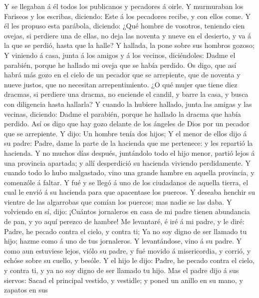  Y se llegaban á él todos los publicanos y pecadores á
oirle.  Y murmuraban los Fariseos y los escribas, diciendo:
Este á los pecadores recibe, y con ellos come.  Y él les
propuso esta parábola, diciendo:  ¿Qué hombre de vosotros,
teniendo cien ovejas, si perdiere una de ellas, no deja las noventa y
nueve en el desierto, y va á la que se perdió, hasta que la halle?
 Y hallada, la pone sobre sus hombros gozoso;  Y
viniendo á casa, junta á los amigos y á los vecinos, diciéndoles: Dadme
el parabién, porque he hallado mi oveja que se había perdido.
 Os digo, que así habrá más gozo en el cielo de un pecador
que se arrepiente, que de noventa y nueve justos, que no necesitan
arrepentimiento.  ¿O qué mujer que tiene diez dracmas, si
perdiere una dracma, no enciende el candil, y barre la casa, y busca con
diligencia hasta hallarla?  Y cuando la hubiere hallado,
junta las amigas y las vecinas, diciendo: Dadme el parabién, porque he
hallado la dracma que había perdido.  Así os digo que hay
gozo delante de los ángeles de Dios por un pecador que se arrepiente.
 Y dijo: Un hombre tenía dos hijos;  Y el
menor de ellos dijo á su padre: Padre, dame la parte de la hacienda que
me pertenece: y les repartió la hacienda.  Y no muchos días
después, juntándolo todo el hijo menor, partió lejos á una provincia
apartada; y allí desperdició su hacienda viviendo perdidamente.
 Y cuando todo lo hubo malgastado, vino una grande hambre
en aquella provincia, y comenzóle á faltar.  Y fué y se
llegó á uno de los ciudadanos de aquella tierra, el cual le envió á su
hacienda para que apacentase los puercos.  Y deseaba
henchir su vientre de las algarrobas que comían los puercos; mas nadie
se las daba.  Y volviendo en sí, dijo: ¡Cuántos jornaleros
en casa de mi padre tienen abundancia de pan, y yo aquí perezco de
hambre!  Me levantaré, é iré á mi padre, y le diré: Padre,
he pecado contra el cielo, y contra ti;  Ya no soy digno de
ser llamado tu hijo; hazme como á uno de tus jornaleros.  Y
levantándose, vino á su padre. Y como aun estuviese lejos, viólo su
padre, y fué movido á misericordia, y corrió, y echóse sobre su cuello,
y besóle.  Y el hijo le dijo: Padre, he pecado contra el
cielo, y contra ti, y ya no soy digno de ser llamado tu hijo.
 Mas el padre dijo á sus siervos: Sacad el principal
vestido, y vestidle; y poned un anillo en su mano, y zapatos en sus
